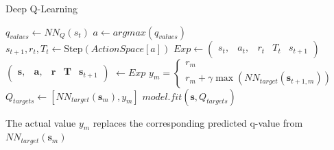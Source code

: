 \documentclass{LTHtwocol} %
\begin{document}
\begin{algorithm}[H]
	\label{alg:deep_q_training}
	\caption{Deep Q-Learning}
	\begin{algorithmic}
			 
				\State $q_{values} \gets NN_Q(s_t)$  %
				\State $a \gets argmax(q_{values})$ 	 %
				\State $s_{t+1}, r_t, T_t \gets \text{Step}(ActionSpace[a])$ %
				\State $Exp \gets \begin{pmatrix} s_t, & a_t, & r_t & T_t & s_{t+1} \end{pmatrix}$
			\EndWhile
			\State $\begin{pmatrix} \mathbf{s}, & \mathbf{a}, & \mathbf{r} & \mathbf{T} & \mathbf{s}_{t+1} \end{pmatrix}$ $\gets Exp$  
			\State $y_m = \begin{cases} r_m \\ r_m + \gamma \max ( NN_{target}(\mathbf{s}_{t+1, m}) ) \end{cases}$
			\State $Q_{targets} \gets [NN_{target}(\mathbf{s}_m), y_m]$  
			\State $model.fit(\mathbf{s}, Q_{targets})$
		\EndFor
	\end{algorithmic}
\end{algorithm}
The actual value $y_m$ replaces the corresponding predicted q-value from $NN_{target}(\mathbf{s}_m)$








%
\end{document}
